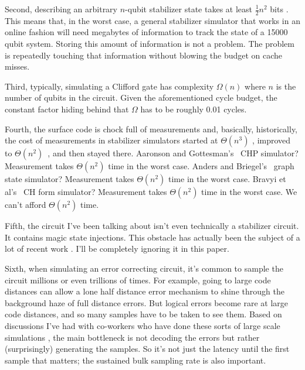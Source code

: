 \documentclass[onecolumn,unpublished]{quantumarticle}
\theoremstyle{definition}
\theoremstyle{definition}
\theoremstyle{definition}
\begin{document}
Second, describing an arbitrary $n$-qubit stabilizer state takes at least $\frac{1}{2} n^2$ bits \cite{gross2006hudson,karanjai2018contextuality,howmanystabilizers2021}.
This means that, in the worst case, a general stabilizer simulator that works in an online fashion will need megabytes of information to track the state of a 15000 qubit system.
Storing this amount of information is not a problem.
The problem is repeatedly touching that information without blowing the budget on cache misses.

Third, typically, simulating a Clifford gate has complexity $\Omega(n)$ where $n$ is the number of qubits in the circuit.
Given the aforementioned cycle budget, the constant factor hiding behind that $\Omega$ has to be roughly 0.01 cycles.

Fourth, the surface code is chock full of measurements and, basically, historically, the cost of measurements in stabilizer simulators started at $\Theta(n^3)$ \cite{gottesman1997stabilizerformalism}, improved to $\Theta(n^2)$~\cite{aaronson2004chp}, and then stayed there.
Aaronson and Gottesman's~\cite{aaronson2004chp} CHP simulator?
Measurement takes $\Theta(n^2)$ time in the worst case.
Anders and Briegel's~\cite{anders2006fastgraphsim} graph state simulator?
Measurement takes $\Theta(n^2)$ time in the worst case.
Bravyi et al's~\cite{bravyi2019simulation} CH form simulator?
Measurement takes $\Theta(n^2)$ time in the worst case.
We can't afford $\Theta(n^2)$ time.

Fifth, the circuit I've been talking about isn't even technically a stabilizer circuit.
It contains magic state injections.
This obstacle has actually been the subject of a lot of recent work \cite{bravyi2019simulation,bu2019efficient,huang2020feynman,huang2019approximate}.
I'll be completely ignoring it in this paper.

Sixth, when simulating an error correcting circuit, it's common to sample the circuit millions or even trillions of times.
For example, going to large code distances can allow a lone half distance error mechanism to shine through the background haze of full distance errors.
But logical errors become rare at large code distances, and so many samples have to be taken to see them.
Based on discussions I've had with co-workers who have done these sorts of large scale simulations \cite{conversationmikeasutin}, the main bottleneck is not decoding the errors but rather (surprisingly) generating the samples.
So it's not just the latency until the first sample that matters; the sustained bulk sampling rate is also important.
\end{document}
